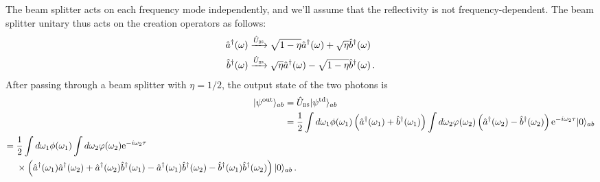 \documentclass[12pt]{article}
\newcommand{\ket}[2] {| #1 \rangle_{#2}}
\newcommand{\dg}{^{\dagger}}
\newcommand{\ee}[1] {\mathrm{e}^{#1}}
\begin{document}
The beam splitter acts on each frequency mode independently, and we'll assume that the reflectivity is not frequency-dependent. The beam splitter unitary thus acts on the creation operators as follows:
\begin{align}\label{eq:bsomega}
\hat{a}\dg(\omega)\xrightarrow{\hat{U}_{\textsc{bs}}} {}& \sqrt{1-\eta}\hat{a}\dg(\omega)+\sqrt{\eta}\hat{b}\dg(\omega)\\
\hat{b}\dg(\omega)\xrightarrow{\hat{U}_{\textsc{bs}}} {}& \sqrt{\eta}\hat{a}\dg(\omega)-\sqrt{1-\eta}\hat{b}\dg(\omega)\,.
\end{align}
After passing through a beam splitter  with $\eta=1/2$,  the output state of the two photons is
\begin{align}
\ket{\psi^{\mathrm{out}}}{ab}={}&\hat{U}_{\textsc{bs}}\ket{\psi^{\mathrm{td}}}{ab}\\
={}&
\frac{1}{2}\int d\omega_{1} \phi(\omega_{1})\left(\hat{a}\dg(\omega_{1})+\hat{b}\dg(\omega_{1})\right)\int d\omega_{2} \varphi(\omega_{2})\left(\hat{a}\dg(\omega_{2})-\hat{b}\dg(\omega_{2})\right)\ee{-i\omega_{2} \tau}\ket{0}{ab}\\\label{eq:stateesr}
\begin{split}
={}&\frac{1}{2}\int d\omega_{1} \phi(\omega_{1})\int d\omega_{2} \varphi(\omega_{2})\ee{-i\omega_{2} \tau}\\
&\times\left(\hat{a}\dg(\omega_{1})\hat{a}\dg(\omega_{2})+\hat{a}\dg(\omega_{2})\hat{b}\dg(\omega_{1})-\hat{a}\dg(\omega_{1})\hat{b}\dg(\omega_{2})-\hat{b}\dg(\omega_{1})\hat{b}\dg(\omega_{2})\right)\ket{0}{ab}\,.
\end{split}
\end{align}
\end{document}
